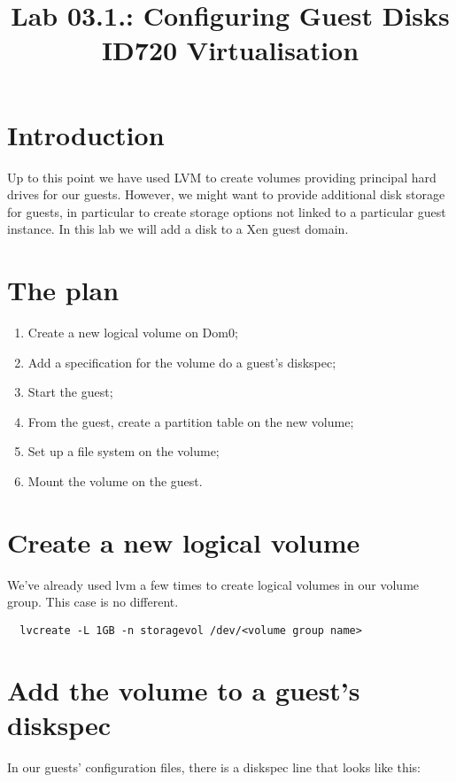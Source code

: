 \documentclass{article}
\begin{document}
\title{Lab 03.1.: Configuring Guest Disks\\ ID720 Virtualisation}
\date{}
\maketitle

\section*{Introduction}
Up to this point we have used LVM to create volumes providing principal hard drives for our guests. However, we might want to provide additional disk storage for guests, in particular to create storage options not linked to a particular guest instance. In this lab we will add a disk to a Xen guest domain.

\section{The plan}


\begin{enumerate}
  \item Create a new logical volume on Dom0;
  \item Add a specification for the volume do a guest's diskspec;
  \item Start the guest;
  \item From the guest, create a partition table on the new volume;
  \item Set up a file system on the volume;
  \item Mount the volume on the guest.
\end{enumerate}

\section{Create a new logical volume}
We've already used lvm a few times to create logical volumes in our volume group. This case is no different.

\begin{verbatim}
  lvcreate -L 1GB -n storagevol /dev/<volume group name>
\end{verbatim}

\section{Add the volume to a guest's diskspec}

In our guests' configuration files, there is a diskspec line that looks like this:
\end{document}
